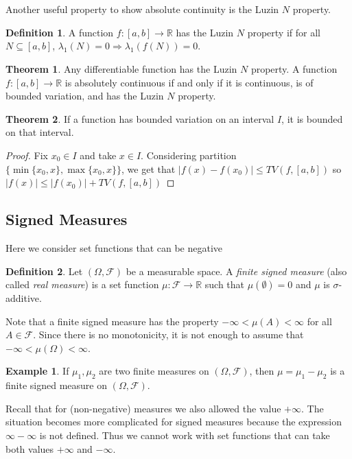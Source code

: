 \documentclass[11pt,a4paper]{article}
\theoremstyle{definition}
\newtheorem{definition}{Definition}[section]
\newtheorem{theorem}{Theorem}[section]
\newtheorem{example}{Example}[section]
\begin{document}
~\\~\\Another useful property to show absolute continuity is the Luzin $N$ property. \begin{definition}
A function $f: [a,b] \to \mathbb{R}$ has the Luzin $N$ property if for all $N \subseteq [a,b]$, $\lambda_1 (N) = 0 \Rightarrow \lambda_1 (f(N)) = 0$.
\end{definition}

\begin{theorem}
Any differentiable function has the Luzin $N$ property. A function $f: [a,b] \to \mathbb{R}$ is absolutely continuous if and only if it is continuous, is of bounded variation, and has the Luzin $N$ property.
\end{theorem}

\begin{theorem}
If a function has bounded variation on an interval $I$, it is bounded on that interval. 
\end{theorem}

\begin{proof}
    Fix $x_0 \in I$ and take $x \in I$. Considering partition $\{\min \{x_0, x\}, \max \{x_0, x\}\}$, we get that $|f(x) - f(x_0)| \le TV(f, [a,b])$ so $|f(x)| \le |f(x_0)| + TV(f, [a,b])$
\end{proof}

\subsection{Signed Measures}
Here we consider set functions that can be negative
\begin{definition}
Let $(\Omega,\mathcal{F})$ be a measurable space.  A \emph{finite signed measure} (also called \emph{real measure}) is a set function $\mu\colon \mathcal{F}\to\mathbb{R}$ such that $\mu(\emptyset)=0$ and $\mu$ is $\sigma$-additive.
\end{definition}
\noindent Note that a finite signed measure has the property $-\infty<\mu(A)<\infty$ for all $A\in\mathcal{F}$. Since there is no monotonicity, it is not enough to assume that $-\infty<\mu(\Omega)<\infty$.  

\begin{example}
If $\mu_1,\mu_2$ are two finite measures on $(\Omega,\mathcal{F})$, then $\mu=\mu_1-\mu_2$ is a finite signed measure on $(\Omega,\mathcal{F})$.  
\end{example}\noindent
Recall that for (non-negative) measures we also allowed the value $+\infty$.  The situation becomes more complicated for signed measures because the expression $\infty - \infty$ is not defined.  Thus we cannot work with set functions that can take both values $+\infty$ and $-\infty$.  
\end{document}
